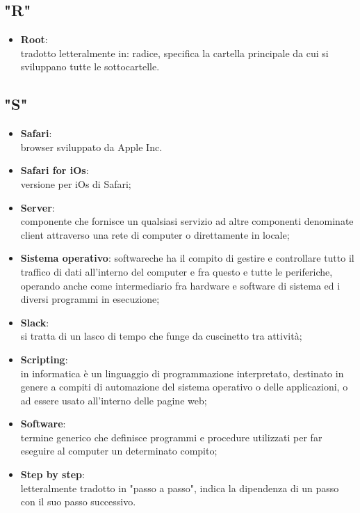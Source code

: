 \subsection{"R"}
\begin{itemize}
\item \textbf{Root}:\\ tradotto letteralmente in: radice, specifica la cartella principale da cui si sviluppano tutte le sottocartelle.
\end{itemize}
\subsection{"S"}
\begin{itemize}
\item \textbf{Safari}:\\ browser sviluppato da Apple Inc.
\item \textbf{Safari for iOs}:\\ versione per iOs di Safari;
\item \textbf{Server}:\\ componente che fornisce un qualsiasi servizio ad altre componenti denominate client attraverso una rete di computer o direttamente in locale;
\item \textbf{Sistema operativo}: software\ped che ha il compito di gestire e controllare tutto il traffico di dati all’interno del computer e fra questo e tutte le periferiche, operando anche come intermediario fra hardware e software di sistema ed i diversi programmi in esecuzione;
\item \textbf{Slack}:\\ si tratta di un lasco di tempo che funge da cuscinetto tra attività;
\item \textbf{Scripting}:\\ in informatica è un linguaggio di programmazione interpretato, destinato in genere a compiti di automazione del sistema operativo o delle applicazioni, o ad essere usato all'interno delle pagine web;
\item \textbf{Software}:\\ termine generico che definisce programmi e procedure utilizzati per far eseguire al computer un determinato compito;
\item \textbf{Step by step}:\\ letteralmente tradotto in "passo a passo", indica la dipendenza di un passo con il suo passo successivo.
\end{itemize} 

